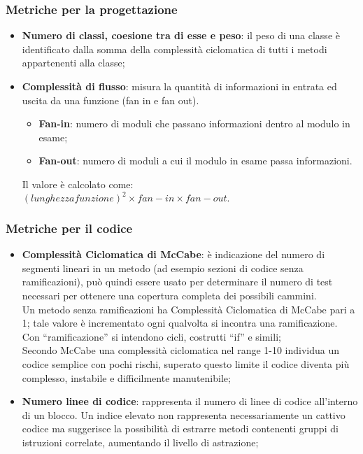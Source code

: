 {\subsubsection{Metriche per la progettazione}{
	\begin{itemize}
		\item \textbf{Numero di classi, coesione tra di esse e peso}: il peso di una	classe è identificato dalla somma della complessità ciclomatica di tutti i metodi appartenenti alla classe;
	 	\item \textbf{Complessità di flusso}: misura la quantità di informazioni in	entrata ed uscita da una funzione (fan in e fan out).\\
	 	\begin{itemize}
	 	 \item \textbf{Fan-in}: numero di moduli che passano informazioni dentro al modulo in esame;
	 	 \item \textbf{Fan-out}: numero di moduli a cui il modulo in esame passa informazioni.
	 	\end{itemize}
	 	Il valore è calcolato come:\\
	 	$(lunghezzafunzione)^2\times fan-in \times fan-out.$
	\end{itemize}
\subsubsection{Metriche per il codice}{
	\begin{itemize}
		\item \textbf{Complessità Ciclomatica di McCabe}: è indicazione del numero di segmenti lineari in un metodo (ad esempio sezioni di codice senza ramificazioni), può quindi essere usato per determinare il numero di test necessari per ottenere una copertura completa dei possibili cammini.  \\
		Un metodo senza ramificazioni ha Complessità Ciclomatica di McCabe pari a 1; tale valore è incrementato ogni qualvolta si incontra una ramificazione.  \\
		Con “ramificazione” si intendono cicli, costrutti “if” e simili;\\
		Secondo McCabe una complessità ciclomatica nel range 1-10 individua un codice semplice con pochi rischi, superato questo limite il codice diventa più complesso, instabile e difficilmente manutenibile;
		
		\item \textbf{Numero linee di codice}: rappresenta il numero di linee di codice all'interno di un blocco. 
		Un indice elevato non rappresenta necessariamente un cattivo codice ma suggerisce la possibilità di estrarre metodi contenenti gruppi di istruzioni correlate, aumentando il livello di astrazione;
		

\end{itemize}}}}
